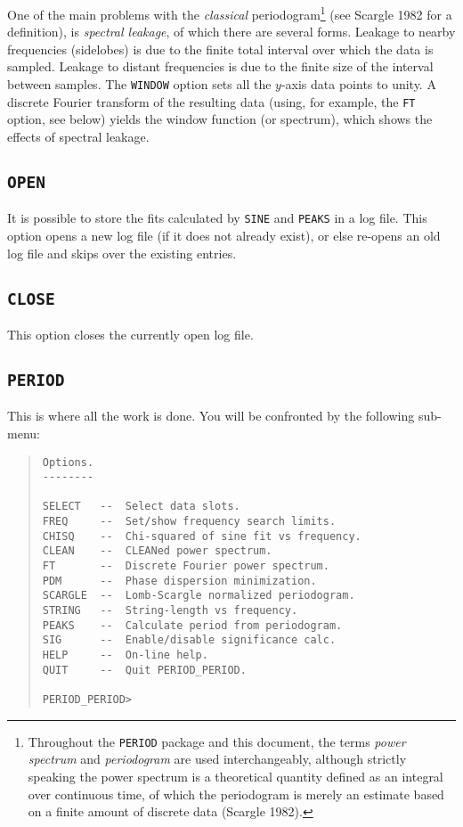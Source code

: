 One of the main problems with the {\em classical}
periodogram\footnote{Throughout the {\tt PERIOD} package and this document, the
terms {\em power spectrum} and {\em periodogram} are used interchangeably,
although strictly speaking the power spectrum is a theoretical quantity defined
as an integral over continuous time, of which the periodogram is merely an
estimate based on a finite amount of discrete data (Scargle 1982).}  (see
Scargle 1982 for a definition), is {\em spectral leakage}, of which there are
several forms. Leakage to nearby frequencies (sidelobes) is due to the finite
total interval over which the data is sampled. Leakage to distant frequencies
is due to the finite size of the interval between samples. The {\tt WINDOW}
option sets all the $y$-axis data points to unity. A discrete Fourier transform
of the resulting data (using, for example, the {\tt FT} option, see below)
yields the window function (or spectrum), which shows the effects of spectral
leakage.

\subsection*{\tt OPEN}

It is possible to store the fits calculated by {\tt SINE} and {\tt PEAKS} in a
log file. This option opens a new log file (if it does not already exist), or
else re-opens an old log file and skips over the existing entries.

\subsection*{\tt CLOSE}

This option closes the currently open log file.

\subsection*{\tt PERIOD}

This is where all the work is done. You will be confronted by the following
sub-menu:

\begin{quote}
\begin{verbatim}
Options.
--------

SELECT   --  Select data slots.
FREQ     --  Set/show frequency search limits.
CHISQ    --  Chi-squared of sine fit vs frequency.
CLEAN    --  CLEANed power spectrum.
FT       --  Discrete Fourier power spectrum.
PDM      --  Phase dispersion minimization.
SCARGLE  --  Lomb-Scargle normalized periodogram.
STRING   --  String-length vs frequency.
PEAKS    --  Calculate period from periodogram.
SIG      --  Enable/disable significance calc.
HELP     --  On-line help.
QUIT     --  Quit PERIOD_PERIOD.

PERIOD_PERIOD>
\end{verbatim}
\end{quote}

